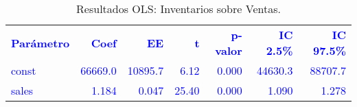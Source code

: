 \begin{table}[H]
\centering
\caption{Resultados OLS: Inventarios sobre Ventas.}
\label{tab:ex8_m1}
\begin{tabular}{lrrrrrr}
\rowcolor{blue!10}
\toprule
\rowcolor{blue!20}
\textcolor{blue}{\textbf{Parámetro}} & \textcolor{blue}{\textbf{Coef}} & \textcolor{blue}{\textbf{EE}} & \textcolor{blue}{\textbf{t}} & \textcolor{blue}{\textbf{p-valor}} & \textcolor{blue}{\textbf{IC 2.5\%}} & \textcolor{blue}{\textbf{IC 97.5\%}} \\
\addlinespace
\rowcolor{blue!10}
\textcolor{blue}{const} & \textcolor{blue}{66669.0} & \textcolor{blue}{10895.7} & \textcolor{blue}{6.12} & \textcolor{blue}{0.000} & \textcolor{blue}{44630.3} & \textcolor{blue}{88707.7} \\
\rowcolor{blue!10}
\textcolor{blue}{sales} & \textcolor{blue}{1.184} & \textcolor{blue}{0.047} & \textcolor{blue}{25.40} & \textcolor{blue}{0.000} & \textcolor{blue}{1.090} & \textcolor{blue}{1.278} \\
\bottomrule
\end{tabular}
\end{table}
